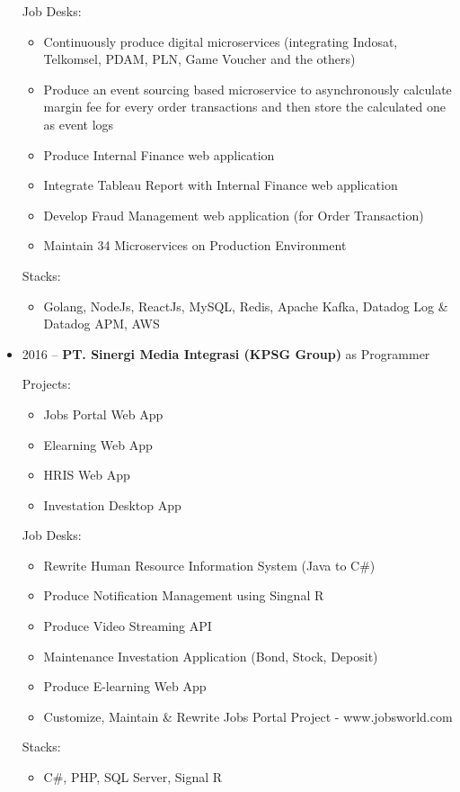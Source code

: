 \documentclass[11pt,a4paper,english]{article}
\begin{document}
\begin{itemize}
\begin{itemize}
	\end{itemize}
	\par Job Desks:
	\begin{itemize}
	    \item Continuously produce digital microservices (integrating Indosat, Telkomsel, PDAM, PLN, Game Voucher and the others)
		\item Produce an event sourcing based microservice to asynchronously calculate margin fee for every order transactions and then store the calculated one as event logs
		\item Produce Internal Finance web application
		\item Integrate Tableau Report with Internal Finance web application
		\item Develop Fraud Management web application (for Order Transaction)
		\item Maintain 34 Microservices on Production Environment
	\end{itemize}
	\par Stacks:
	\begin{itemize}
		\item Golang, NodeJs, ReactJs, MySQL, Redis, Apache Kafka, Datadog Log \& Datadog APM, AWS
	\end{itemize}
	\item 2016 -- \textbf{PT. Sinergi Media Integrasi (KPSG Group)} as Programmer
	\par \noindent Projects:
	\begin{itemize}
		\item Jobs Portal Web App
		\item Elearning Web App
		\item HRIS Web App
		\item Investation Desktop App
	\end{itemize}
	\par Job Desks:
	\begin{itemize}
		\item Rewrite Human Resource Information System (Java to C\#)
		\item Produce Notification Management using Singnal R
		\item Produce Video Streaming API
		\item Maintenance Investation Application (Bond, Stock, Deposit)
		\item Produce E-learning Web App
		\item Customize, Maintain \& Rewrite Jobs Portal Project - www.jobsworld.com
	\end{itemize}
	\par Stacks:
	\begin{itemize}
		\item C\#, PHP, SQL Server, Signal R
	\end{itemize}
	

\end{itemize}
\end{document}
